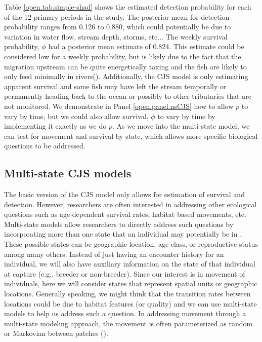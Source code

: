 Table \ref{open.tab.simple-shad} shows the estimated detection
probability for each of the 12 primary periods in the study.  The
posterior mean for detection probability ranges from 0.126 to 0.880,
which could potentially be due to variation in water flow, stream
depth, storms, etc$\dots$ The weekly survival probability, $\phi$ had
a posterior mean estimate of 0.824.  This estimate could be considered
low for a weekly probability, but is likely due to the fact that the
migration upstream can be quite energetically taxing and the fish are
likely to only feed minimally in
rivers(\citep{leggett_carscadden:1978, leonard_mccormick:1999}).
Additionally, the CJS model is only estimating apparent survival and
some fish may have left the stream temporally or permanently heading
back to the ocean or possibly to other tributaries that are not
monitored.  We demonstrate in Panel \ref{open.panel.nsCJS} how to
allow $p$ to vary by time, but we could also allow survival, $\phi$ to
vary by time by implementing it exactly as we do $p$.  As we move into
the multi-state model, we can test for movement and survival by state,
which allows more specific biological questions to be addressed.


\subsection{Multi-state CJS models}

The basic version of the CJS model only allows for estimation of
survival and detection.  However, researchers are often interested in
addressing other ecological questions such as age-dependent survival
rates, habitat based movements, etc.  Multi-state models allow
researchers to directly address such questions by incorporating more
than one state that an individual may potentially be in
\cite{arnason:1972,arnason:1973, brownie_etal:1993}.  These possible
states can be geographic location, age class, or reproductive status
among many others.  Instead of just having an encounter history for an
individual, we will also have auxiliary information on the state of
that individual at capture (e.g., breeder or non-breeder).  Since our
interest is in movement of individuals, here we will consider states
that represent spatial units or geographic locations.  Generally
speaking, we might think that the transition rates between locations
could be due to habitat features (or quality) and we can use
multi-state models to help us address such a question.  In addressing
movement through a multi-state modeling approach, the movement is
often parameterized as random or Markovian between patches
(\cite{arnason:1972,arnason:1973, schwarz_etal:1993}).

